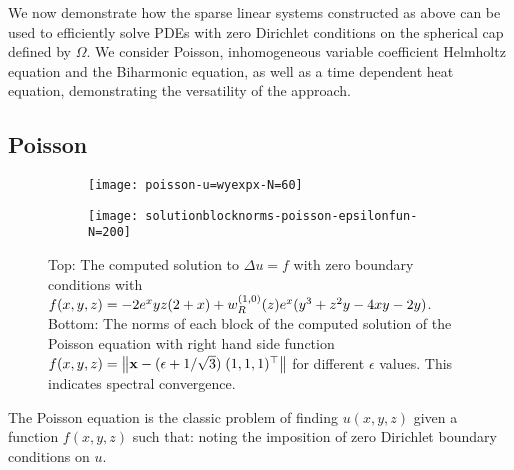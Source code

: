 We now demonstrate how the sparse linear systems constructed as above can be used to efficiently solve PDEs with zero Dirichlet conditions on the spherical cap defined by $\Omega$. We consider Poisson, inhomogeneous variable coefficient Helmholtz equation and the Biharmonic equation, as well as a time dependent heat equation, demonstrating the versatility of the approach.

\subsection{Poisson}


\begin{figure}[tp]
	\centering
	\begin{subfigure}{0.85\textwidth}
		\texttt{[image: poisson-u=wyexpx-N=60]}
	\end{subfigure}
	\hfill%
	
	\begin{subfigure}{0.55\textwidth}
		\texttt{[image: solutionblocknorms-poisson-epsilonfun-N=200]}
	\end{subfigure}
	\hfill%
	\caption{Top: The computed solution to $\Delta u = f$ with zero boundary conditions with $f(x,y,z) = - 2 e^x y z (2+x) + w_R^{(1,0)}(z) e^x (y^3 + z^2 y - 4xy - 2y)$. Bottom: The norms of each block of the computed solution of the Poisson equation with right hand side function $f(x,y,z) = \left\| \mathbf{x} - (\epsilon + 1 / \sqrt{3}) \; (1,1,1)^\top  \right\|$ for different $\epsilon$ values. This indicates spectral convergence.}
	\label{fig:sc:poisson}
\end{figure}


The Poisson equation is the classic problem of finding $u(x,y,z)$ given a function $f(x,y,z)$ such that:
noting the imposition of zero Dirichlet boundary conditions on $u$.

